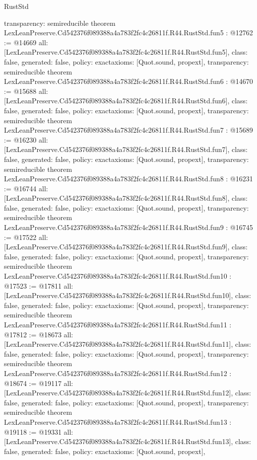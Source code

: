 \begin{lexlean}{RustStd}
\begin{coremodule}
{  transparency: semireducible
}
theorem LexLeanPreserve.Cd542376f089388a4a783f2fc4c26811f.R44.RustStd.fun5 : @12762 := @14669 {
  all: [LexLeanPreserve.Cd542376f089388a4a783f2fc4c26811f.R44.RustStd.fun5],
  class: false,
  generated: false,
  policy: exact{axioms: [Quot.sound, propext]},
  transparency: semireducible
}
theorem LexLeanPreserve.Cd542376f089388a4a783f2fc4c26811f.R44.RustStd.fun6 : @14670 := @15688 {
  all: [LexLeanPreserve.Cd542376f089388a4a783f2fc4c26811f.R44.RustStd.fun6],
  class: false,
  generated: false,
  policy: exact{axioms: [Quot.sound, propext]},
  transparency: semireducible
}
theorem LexLeanPreserve.Cd542376f089388a4a783f2fc4c26811f.R44.RustStd.fun7 : @15689 := @16230 {
  all: [LexLeanPreserve.Cd542376f089388a4a783f2fc4c26811f.R44.RustStd.fun7],
  class: false,
  generated: false,
  policy: exact{axioms: [Quot.sound, propext]},
  transparency: semireducible
}
theorem LexLeanPreserve.Cd542376f089388a4a783f2fc4c26811f.R44.RustStd.fun8 : @16231 := @16744 {
  all: [LexLeanPreserve.Cd542376f089388a4a783f2fc4c26811f.R44.RustStd.fun8],
  class: false,
  generated: false,
  policy: exact{axioms: [Quot.sound, propext]},
  transparency: semireducible
}
theorem LexLeanPreserve.Cd542376f089388a4a783f2fc4c26811f.R44.RustStd.fun9 : @16745 := @17522 {
  all: [LexLeanPreserve.Cd542376f089388a4a783f2fc4c26811f.R44.RustStd.fun9],
  class: false,
  generated: false,
  policy: exact{axioms: [Quot.sound, propext]},
  transparency: semireducible
}
theorem LexLeanPreserve.Cd542376f089388a4a783f2fc4c26811f.R44.RustStd.fun10 : @17523 := @17811 {
  all: [LexLeanPreserve.Cd542376f089388a4a783f2fc4c26811f.R44.RustStd.fun10],
  class: false,
  generated: false,
  policy: exact{axioms: [Quot.sound, propext]},
  transparency: semireducible
}
theorem LexLeanPreserve.Cd542376f089388a4a783f2fc4c26811f.R44.RustStd.fun11 : @17812 := @18673 {
  all: [LexLeanPreserve.Cd542376f089388a4a783f2fc4c26811f.R44.RustStd.fun11],
  class: false,
  generated: false,
  policy: exact{axioms: [Quot.sound, propext]},
  transparency: semireducible
}
theorem LexLeanPreserve.Cd542376f089388a4a783f2fc4c26811f.R44.RustStd.fun12 : @18674 := @19117 {
  all: [LexLeanPreserve.Cd542376f089388a4a783f2fc4c26811f.R44.RustStd.fun12],
  class: false,
  generated: false,
  policy: exact{axioms: [Quot.sound, propext]},
  transparency: semireducible
}
theorem LexLeanPreserve.Cd542376f089388a4a783f2fc4c26811f.R44.RustStd.fun13 : @19118 := @19331 {
  all: [LexLeanPreserve.Cd542376f089388a4a783f2fc4c26811f.R44.RustStd.fun13],
  class: false,
  generated: false,
  policy: exact{axioms: [Quot.sound, propext]},
}
\end{coremodule}
\end{lexlean}
